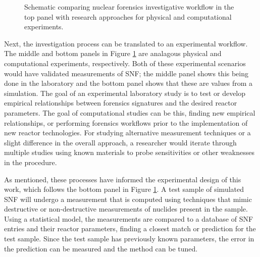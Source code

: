 \begin{figure}[!tbh]
  \caption{Schematic comparing nuclear forensics investigative workflow in the 
           top panel with research approaches for physical and computational 
           experiments.}
  \label{fig:nfworkflows}
\end{figure}

Next, the investigation process can be translated to an experimental workflow.
The middle and bottom panels in Figure \ref{fig:nfworkflows} are analagous
physical and computational experiments, respectively.  Both of these
experimental scenarios would have validated measurements of \gls{SNF}; the
middle panel shows this being done in the laboratory and the bottom panel shows
that these are values from a simulation. The goal of an experimental laboratory
study is to test or develop empirical relationships between forensics
signatures and the desired reactor parameters. The goal of computational
studies can be this, finding new empirical relationships, or performing
forensics workflows prior to the implementation of new reactor technologies.
For studying alternative measurement techniques or a slight difference in the
overall approach, a researcher would iterate through multiple studies using
known materials to probe sensitivities or other weaknesses in the procedure.

As mentioned, these processes have informed the experimental design of this
work, which follows the bottom panel in Figure \ref{fig:nfworkflows}. A test
sample of simulated \gls{SNF} will undergo a measurement that is computed using
techniques that mimic destructive or non-destructive measurements of nuclides
present in the sample.  Using a statistical model, the measurements are
compared to a database of \gls{SNF} entries and their reactor parameters,
finding a closest match or prediction for the test sample. Since the test
sample has previously known parameters, the error in the prediction can be
measured and the method can be tuned. 

